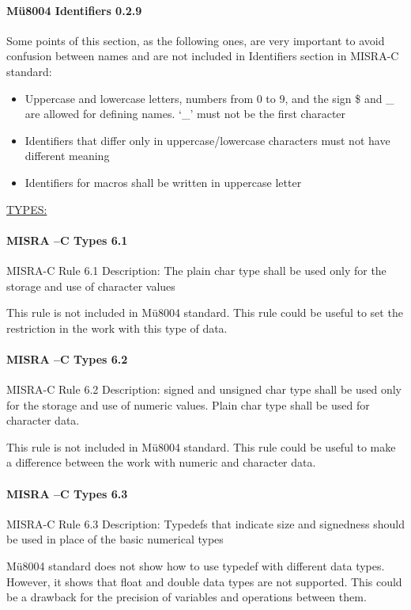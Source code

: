 \paragraph{Mü8004 Identifiers 0.2.9}
Some points of this section, as the following ones, are very important to avoid confusion between names and are not included in Identifiers section in MISRA-C standard:
\begin{itemize}
\item Uppercase and lowercase letters, numbers from 0 to 9, and the sign \$ and \_ are allowed for defining names. ‘\_’ must not be the first character
\item Identifiers that differ only in uppercase/lowercase characters must not have different meaning
\item Identifiers for macros shall be written in uppercase letter
\end{itemize}

\begin{center}
\textsc{\underline{TYPES:}}
\end{center}

\paragraph{MISRA –C Types 6.1}
MISRA-C Rule 6.1 Description: The plain char type shall be used only for the storage and use of character values

This rule is not included in Mü8004 standard. This rule could be useful to set the restriction in the work with this type of data.

\paragraph{MISRA –C Types 6.2}
MISRA-C Rule 6.2 Description: signed and unsigned char type shall be used only for the storage and use of numeric values. Plain char type shall be used for character data.

This rule is not included in Mü8004 standard. This rule could be useful to make a difference between the work with numeric and character data.

\paragraph{MISRA –C Types 6.3}
MISRA-C Rule 6.3 Description: Typedefs that indicate size and signedness should be used in place of the basic numerical types

Mü8004 standard does not show how to use typedef with different data types. However, it shows that float and double data types are not supported. This could be a drawback for the precision of variables and operations between them.

